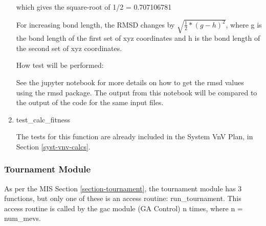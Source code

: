 \documentclass[12pt, titlepage]{article}
\begin{document}
\begin{enumerate}
which gives the square-root of 1/2 = 0.707106781

For increasing bond length, the RMSD changes by $\sqrt{\frac{1}{2}*(g-h)^2}$, 
where g is the bond length of the first set of xyz coordinates and h is the 
bond length of the second set of xyz coordinates.

How test will be performed: 

See the jupyter notebook for more details on how to get the rmsd values using 
the rmsd package. The output from this notebook will be compared to the output 
of the code for the same input files.

\item{test\_calc\_fitness\\}

The tests for this function are already included in the System VnV Plan, in 
Section \ref{syst-vnv-calcs}.
	
\end{enumerate}

\subsubsection{Tournament Module}\label{test-tournament}

As per the MIS Section \ref{section-tournament}, the tournament module has 3 
functions, but only one of these is an access routine: run\_tournament. This 
access routine is called by the gac module (GA Control) n times, where n = 
num\_mevs. 

\end{document}
